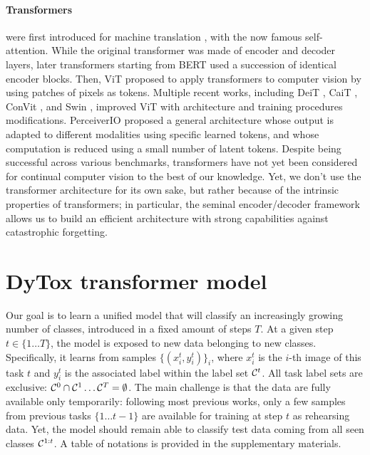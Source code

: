 \paragraph{Transformers} were first introduced for machine translation
\citep{vaswani2017transformer}, with the now famous self-attention. While the original transformer
was made of encoder and decoder layers, later transformers starting from BERT \citep{devlin2018bert}
used a succession of identical encoder blocks. Then, ViT \citep{dosovitskiy2020vit} proposed to apply
transformers to computer vision by using patches of pixels as tokens. Multiple recent works,
including DeiT \citep{touvron2021deit}, CaiT \citep{touvron2021cait}, ConVit \citep{dascoli2021convit},
and Swin \citep{liu2021swin}, improved ViT with architecture and training procedures modifications.
PerceiverIO \citep{jaegle2021perceiverio} proposed a general architecture whose output is adapted to
different modalities using specific learned tokens, and whose computation is reduced using a small
number of latent tokens. Despite being successful across various benchmarks, transformers have not
yet been considered for continual computer vision to the best of our knowledge. Yet, we don't use
the transformer architecture for its own sake, but rather because of the intrinsic properties of
transformers; in particular, the seminal encoder/decoder framework allows us to build an efficient
architecture with strong capabilities against catastrophic forgetting.

\section{DyTox transformer model}
\label{sec:dytox_model}


\label{sec:dytox_problem}


Our goal is to learn a unified model that will classify an increasingly growing number of classes,
introduced in a fixed amount of steps $T$. At a given step $t \in \{1 \dots T\}$, the model is
exposed to new data belonging to new classes. Specifically, it learns from samples $\{(x_i^t,
    y_i^t)\}_{i}$, where $x_i^t$ is the $i$-th image of this task $t$ and $y_i^t$ is the associated
label within the label set $\mathcal{C}^t$. All task label sets are exclusive: $\mathcal{C}^0 \cap \mathcal{C}^1 \dots
    \mathcal{C}^T = \emptyset$. The main challenge is that the data are fully available only temporarily:
following most previous works, only a few samples from previous tasks $\{1 \dots t-1\}$ are
available for training at step $t$ as rehearsing data. Yet, the model should remain able to classify
test data coming from all seen classes $\mathcal{C}^{1:t}$. A table of notations is provided in the
supplementary materials.

